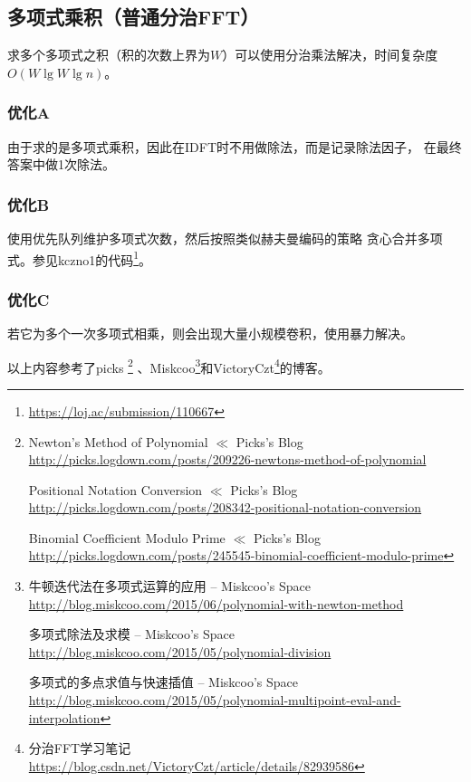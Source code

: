 \subsection{多项式乘积（普通分治FFT）}
求多个多项式之积（积的次数上界为$W$）可以使用分治乘法解决，时间复杂度
$O(W\lg W\lg n)$。

\subsubsection{优化A} 由于求的是多项式乘积，因此在IDFT时不用做除法，而是记录除法因子，
在最终答案中做1次除法。

\subsubsection{优化B} 使用优先队列维护多项式次数，然后按照类似赫夫曼编码的策略
贪心合并多项式。参见kczno1的代码\footnote{\url{https://loj.ac/submission/110667}}。

\subsubsection{优化C} 若它为多个一次多项式相乘，则会出现大量小规模卷积，使用暴力解决。

以上内容参考了picks
\footnote{
Newton's Method of Polynomial $\ll$ Picks's Blog
\\\url{http://picks.logdown.com/posts/209226-newtons-method-of-polynomial}

Positional Notation Conversion $\ll$ Picks's Blog
\\\url{http://picks.logdown.com/posts/208342-positional-notation-conversion}

Binomial Coefficient Modulo Prime $\ll$ Picks's Blog
\\\url{http://picks.logdown.com/posts/245545-binomial-coefficient-modulo-prime}

}
、Miskcoo\footnote{
牛顿迭代法在多项式运算的应用 – Miskcoo's Space
\\\url{http://blog.miskcoo.com/2015/06/polynomial-with-newton-method}

多项式除法及求模 – Miskcoo's Space
\\\url{http://blog.miskcoo.com/2015/05/polynomial-division}

多项式的多点求值与快速插值 – Miskcoo's Space
\\\url{http://blog.miskcoo.com/2015/05/polynomial-multipoint-eval-and-interpolation}
}和VictoryCzt\footnote{
    分治FFT学习笔记
    \url{https://blog.csdn.net/VictoryCzt/article/details/82939586}
}的博客。

